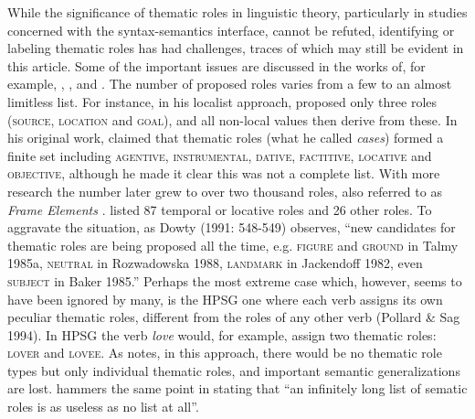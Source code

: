 While the significance of thematic roles in linguistic theory, particularly in studies concerned with the syntax-semantics interface, cannot be refuted, identifying or labeling thematic roles has had challenges, traces of which may still be evident in this article. Some of the important issues are discussed in the works of, for example, \citet{Dowty1991}, \citet{Jackendoff1987}, \citet[689]{Newmeyer2010} and \citet[6]{KittilaEtAl2011}. The number of proposed roles varies from a few to an almost limitless list. For instance, in his localist approach, \citet{Anderson1971} proposed only three roles (\textsc{source, location} and \textsc{goal}), and all non-local values then derive from these. In his original work, \citet{Fillmore1968} claimed that thematic roles (what he called \textit{cases}) formed a finite set including \textsc{agentive, instrumental, dative, factitive, locative} and \textsc{objective,} although he made it clear this was not a complete list. With more research the number later grew to over two thousand roles, also referred to as \textit{Frame Elements} \citep{Fillmore1985}. \citet{Blake1930} listed 87 temporal or locative roles and 26 other roles. To aggravate the situation, as Dowty\textit{ }(1991: 548-549) observes, “new candidates for thematic roles are being proposed all the time, e.g. \textsc{figure} and \textsc{ground} in Talmy 1985a, \textsc{neutral} in Rozwadowska 1988, \textsc{landmark} in Jackendoff 1982, even \textsc{subject} in Baker 1985.” Perhaps the most extreme case which, however, seems to have been ignored by many, is the HPSG one where each verb assigns its own peculiar thematic roles, different from the roles of any other verb (Pollard \& Sag 1994). In HPSG the verb \textit{love} would, for example, assign two thematic roles: \textsc{lover} and \textsc{lovee}. As \citet{Dowty1989} notes, in this approach, there would be no thematic role types but only individual thematic roles, and important semantic generalizations are lost. \citet[52]{Payne1997} hammers the same point in stating that “an infinitely long list of sematic roles is as useless as no list at all”.

